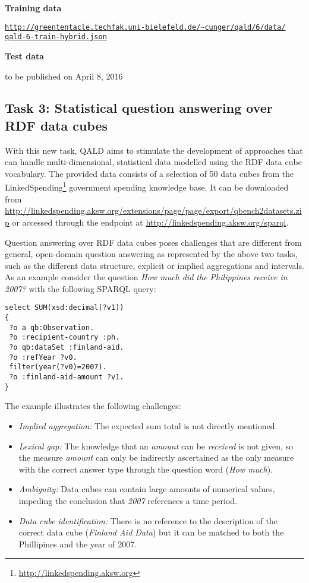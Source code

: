 \textbf{Training data}

\href{http://greententacle.techfak.uni-bielefeld.de/~cunger/qald/6/data/qald-6-train-hybrid.json}{\texttt{http://greententacle.techfak.uni-bielefeld.de/\textasciitilde cunger/qald/6/data/\\qald-6-train-hybrid.json}}

\textbf{Test data}

to be published on April 8, 2016


\subsection{Task 3: Statistical question answering over RDF data cubes}

With this new task, QALD aims to stimulate the development of approaches that can handle multi-dimensional, statistical data modelled using the RDF data cube vocabulary.
The provided data consists of a selection of 50 data cubes from the LinkedSpending\footnote{\url{http://linkedspending.aksw.org}} government spending knowledge base.
It can be downloaded from \url{http://linkedspending.aksw.org/extensions/page/page/export/qbench2datasets.zip}
or accessed through the endpoint at \url{http://linkedspending.aksw.org/sparql}.

Question answering over RDF data cubes poses challenges that are different from general, open-domain question answering as represented by the above two tasks, such as the different data structure, explicit or implied aggregations and intervals.
As an example consider the question \emph{How much did the Philippines receive in 2007?} with the following SPARQL query:

\begin{lstlisting}
select SUM(xsd:decimal(?v1))
{
 ?o a qb:Observation.
 ?o :recipient-country :ph.
 ?o qb:dataSet :finland-aid.
 ?o :refYear ?v0.
 filter(year(?v0)=2007).
 ?o :finland-aid-amount ?v1.
}
\end{lstlisting}
The example illustrates the following challenges:
\begin{itemize}
\item \emph{Implied aggregation:} The expected sum total is not directly mentioned.
\item \emph{Lexical gap:} The knowledge that an \emph{amount} can be \emph{received} is not given, so the measure \emph{amount} can only be indirectly ascertained as the only measure with the correct answer type through the question word (\emph{How much}).
\item \emph{Ambiguity:} Data cubes can contain large amounts of numerical values, impeding the conclusion that \emph{2007} references a time period.
\item \emph{Data cube identification:} There is no reference to the description of the correct data cube (\emph{Finland Aid Data}) but it can be matched to both the Phillipines and the year of 2007.
\end{itemize}

